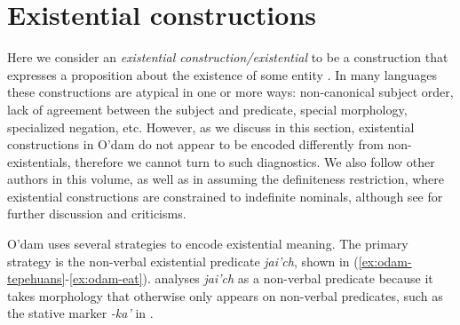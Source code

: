 \documentclass[output=paper]{langsci/langscibook}
\begin{document}
\section{Existential constructions}
\label{sec:odam-excont}
Here we consider an \emph{existential construction/existential} to be a construction that expresses a proposition about the existence of some entity \citep[1829]{mcnally2011}. In many languages these constructions are atypical in one or more ways: non-canonical subject order, lack of agreement between the subject and predicate, special morphology, specialized negation, etc. However, as we discuss in this section, existential constructions in O'dam do not appear to be encoded differently from non-existentials, therefore we cannot turn to such diagnostics. We also follow other authors in this volume, as well as \citet{Veselinova2014,Veselinova2016} in assuming the definiteness restriction, where existential constructions are constrained to indefinite nominals, although see \citet{ziv1982,reulanm1987,abbott1997,beaveretal2006,McNally2016} for further discussion and criticisms.

O’dam uses several strategies to encode existential meaning. The primary
strategy is the non-verbal existential predicate \emph{jai’ch}, shown in
(\ref{ex:odam-tepehuans}-\ref{ex:odam-eat}). \citet[93]{garcia2014}
analyses \emph{jai’ch} as a non-verbal predicate because it takes
morphology that otherwise only appears on non-verbal predicates, such as
the stative marker  \emph{-ka’} in .%
%
\end{document}

